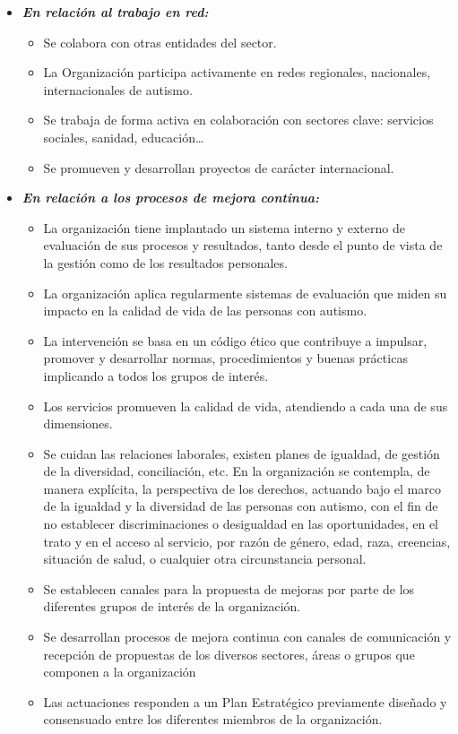 \begin{itemize}
\begin{itemize}
		
		\item \textbf{\textit{En relación al trabajo en red:}}
		\begin{itemize}
			\item Se colabora con otras entidades del sector.  
			\item La Organización participa activamente en redes regionales, nacionales, internacionales de autismo.
			\item Se trabaja de forma activa en colaboración con sectores clave: servicios sociales, sanidad, educación…  
			\item Se promueven y desarrollan proyectos de carácter internacional.
		\end{itemize}  
		\item \textbf{\textit{En relación a los procesos de mejora continua:}}
		\begin{itemize}
			\item La organización tiene implantado un sistema interno y externo de evaluación de sus procesos y resultados, tanto desde el punto de vista de la gestión como de los resultados personales.  
			\item La organización aplica regularmente sistemas de evaluación que miden su impacto en la calidad de vida de las personas con autismo. 
			\item La intervención se basa en un código ético que contribuye a impulsar, promover y desarrollar normas, procedimientos y buenas prácticas implicando a todos los grupos de interés.  
			\item Los servicios promueven la calidad de vida, atendiendo a cada una de sus dimensiones. 
			\item Se cuidan las relaciones laborales, existen planes de igualdad, de gestión de la diversidad, conciliación, etc. En la organización se contempla, de manera explícita, la perspectiva de los derechos, actuando bajo el marco de la igualdad y la diversidad de las personas con autismo, con el fin de no establecer discriminaciones o desigualdad en las oportunidades, en el trato y en el acceso al servicio, por razón de género, edad, raza, creencias, situación de salud, o cualquier otra circunstancia personal.  
			\item Se establecen canales para la propuesta de mejoras por parte de los diferentes grupos de interés de la organización. 
			\item Se desarrollan procesos de mejora continua con canales de comunicación y recepción de propuestas de los diversos sectores, áreas o grupos que componen a la organización
			\item Las actuaciones responden a un Plan Estratégico previamente diseñado y consensuado entre los diferentes miembros de la organización.
		\end{itemize}
		

\end{itemize}
\end{itemize}
